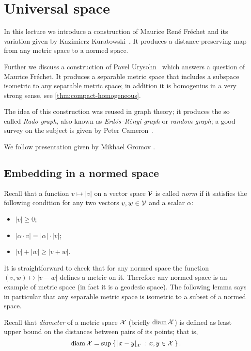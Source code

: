 \chapter{Universal space}

In this lecture we introduce a construction of Maurice René Fréchet \cite{frechet} and its variation given by Kazimierz Kuratowski~\cite{kuratowski}.
It produces a distance-preserving map from any metric space to a normed space.

Further we discuss a construction of Pavel Urysohn~\cite{urysohn} which answers a question of Maurice Fréchet.
It produces a separable metric space that includes a subspace  isometric to any separable metric space; in addition it is homogenius in a very strong sense, see \ref{thm:compact-homogeneous}.

The idea of this construction was reused in graph theory; it produces the so called {}\emph{Rado graph},
also known as {}\emph{Erd\H{o}s–R\'enyi graph} or \emph{random graph}; a good survey on the subject is given by Peter Cameron~\cite{cameron}.

We follow presentation given by Mikhael Gromov \cite{gromov-2007}.

\section{Embedding in a normed space}

Recall that a function $v\mapsto |v|$ on a vector space $\mathcal{V}$ is called \emph{norm} if it satisfies the following condition for any two vectors $v,w\in \mathcal{V}$ and a scalar $\alpha$:
\begin{itemize}
\item $|v|\ge 0$;
\item $|\alpha\cdot v|=|\alpha|\cdot |v|$;
\item $|v|+|w|\ge|v+w|$.
\end{itemize}

It is straightforward to check that for any normed space the function $(v,w)\mapsto |v-w|$ defines a metric on it.
Therefore any normed space is an example of metric space (in fact it is a geodesic space).
The following lemma says in particular that any separable metric space is isometric to a subset of a normed space.

Recall that \emph{diameter} of a metric space $\mathcal{X}$ (briefly $\operatorname{\rm diam}\nolimits \mathcal{X}$) is defined as least upper bound on the distances between pairs of its points;
that is,
\[\diam \spc{X}=\sup\set{\dist{x}{y}{\spc{X}}}{x,y\in \spc{X}}.\]

